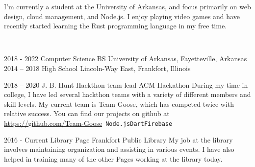 \documentclass[9pt]{developercv} %
\begin{document}
	\begin{minipage}[t]{0.35\textwidth}
		\vspace{-\baselineskip} %

		I'm currently a student at the University of Arkansas, and focus primarily on web design, cloud management, and Node.js. I enjoy playing video games and have recently started learning the Rust programming language in my free time.

	\end{minipage}
	\hfill %
	\begin{minipage}[t]{0.6\textwidth} %
		\vspace{-\baselineskip} %
		\vspace{.2cm}\\
	\end{minipage}

\vspace{-6pt}



\begin{entrylist}
	\entry
		{2018 - 2022}
		{Computer Science BS}
		{}
		{University of Arkansas, Fayetteville, Arkansas}
	\entry
		{2014 -- 2018}
		{High School}
		{}
		{Lincoln-Way East, Frankfort, Illinois}
\end{entrylist}


\begin{entrylist}
	\entry
		{2018 -- 2020}
		{J. B. Hunt Hackthon team lead}
		{ACM Hackathon}
		{During my time in college, I have led several hackthon teams with a variety of different members and skill levels. My current team is Team Goose, which has competed twice with relative success. You can find our projects on github at \href{https://github.com/Team-Goose}{https://github.com/Team-Goose}\
		\newline\texttt{Node.js}\slashsep\texttt{Dart}\slashsep\texttt{Firebase}}
\end{entrylist}

\begin{entrylist}
	\entry
		{2016 - Current}
		{Library Page}
		{Frankfort Public Library}
		{My job at the library involves maintaining organization and assisting in various events. I have also helped in training many of the other Pages working at the library today.}\
\end{entrylist}
\end{document}
